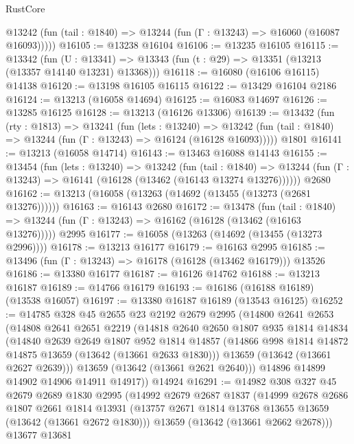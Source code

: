 \begin{lexlean}{RustCore}
\begin{coremodule}
      @13242 (fun (tail : @1840) => @13244 (fun (Γ : @13243) => @16060 (@16087 @16093)))))
@16105 := @13238 @16104
@16106 := @13235 @16105
@16115 := @13342
    (fun (U : @13341) => @13343 (fun (t : @29) => @13351 (@13213 (@13357 @14140 @13231) @13368)))
@16118 := @16080 (@16106 @16115) @14138
@16120 := @13198 @16105 @16115
@16122 := @13429 @16104 @2186
@16124 := @13213 (@16058 @14694)
@16125 := @16083 @14697
@16126 := @13285 @16125
@16128 := @13213 (@16126 @13306)
@16139 := @13432
    (fun (rty : @1813) =>
    @13241
      (fun (lets : @13240) =>
      @13242 (fun (tail : @1840) => @13244 (fun (Γ : @13243) => @16124 (@16128 @16093)))))
    @1801
@16141 := @13213 (@16058 @14714)
@16143 := @13463 @16088 @14143
@16155 := @13454
    (fun (lets : @13240) =>
    @13242
      (fun (tail : @1840) =>
      @13244 (fun (Γ : @13243) => @16141 (@16128 (@13462 (@16143 @13274 @13276))))))
    @2680
@16162 := @13213 (@16058 (@13263 (@14692 (@13455 (@13273 (@2681 @13276))))))
@16163 := @16143 @2680
@16172 := @13478
    (fun (tail : @1840) => @13244 (fun (Γ : @13243) => @16162 (@16128 (@13462 (@16163 @13276)))))
    @2995
@16177 := @16058 (@13263 (@14692 (@13455 (@13273 @2996))))
@16178 := @13213 @16177
@16179 := @16163 @2995
@16185 := @13496 (fun (Γ : @13243) => @16178 (@16128 (@13462 @16179))) @13526
@16186 := @13380 @16177
@16187 := @16126 @14762
@16188 := @13213 @16187
@16189 := @14766 @16179
@16193 := @16186 (@16188 @16189) (@13538 @16057)
@16197 := @13380 @16187 @16189 (@13543 @16125)
@16252 := @14785
    @328
    @45
    @2655
    @23
    @2192
    @2679
    @2995
    (@14800
      @2641
      @2653
      (@14808
        @2641
        @2651
        @2219
        (@14818
          @2640
          @2650
          @1807
          @935
          @1814
          @14834
          (@14840
            @2639
            @2649
            @1807
            @952
            @1814
            @14857
            (@14866 @998 @1814 @14872 @14875 @13659 (@13642 (@13661 @2633 @1830)))
            @13659
            (@13642 (@13661 @2627 @2639)))
          @13659
          (@13642 (@13661 @2621 @2640)))
        @14896
        @14899
        @14902
        @14906
        @14911
        @14917))
    @14924
@16291 := @14982
    @308
    @327
    @45
    @2679
    @2689
    @1830
    @2995
    (@14992
      @2679
      @2687
      @1837
      (@14999
        @2678
        @2686
        @1807
        @2661
        @1814
        @13931
        (@13757 @2671 @1814 @13768 @13655 @13659 (@13642 (@13661 @2672 @1830)))
        @13659
        (@13642 (@13661 @2662 @2678)))
      @13677
      @13681

\end{coremodule}
\end{lexlean}
